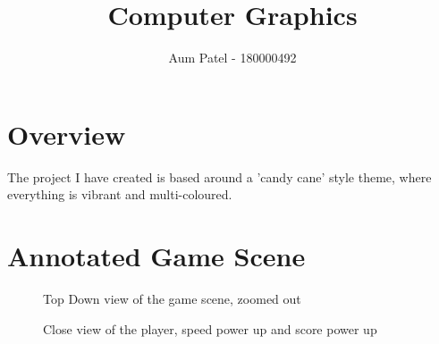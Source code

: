 \documentclass[10pt]{report}
\begin{document}
\author{Aum Patel - 180000492}
\title{Computer Graphics}
\maketitle

\section*{Overview}
The project I have created is based around a 'candy cane' style theme, where everything is vibrant and multi-coloured. 

\section*{Annotated Game Scene}

\begin{figure}[H]
    \begin{minipage}{.5\textwidth}
        \centering
        \caption{Top Down view of the game scene, zoomed out}
    \end{minipage}
    \begin{minipage}{.5\textwidth}
        \centering
        \caption{Close view of the player, speed power up and score power up}
    \end{minipage}
\end{figure}
\end{document}
